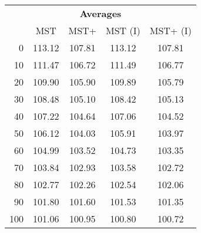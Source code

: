 \begin{tabular}{r|cccc}
      \multicolumn{8}{c}{{\bf Averages }} \\
      & MST & MST+ & MST (I) & MST+ (I) \\ \hline\hline
0
& 113.12
& 107.81
& 113.12
& 107.81
\\
10
& 111.47
& 106.72
& 111.49
& 106.77
\\
20
& 109.90
& 105.90
& 109.89
& 105.79
\\
30
& 108.48
& 105.10
& 108.42
& 105.13
\\
40
& 107.22
& 104.64
& 107.06
& 104.52
\\
50
& 106.12
& 104.03
& 105.91
& 103.97
\\
60
& 104.99
& 103.52
& 104.73
& 103.35
\\
70
& 103.84
& 102.93
& 103.58
& 102.72
\\
80
& 102.77
& 102.26
& 102.54
& 102.06
\\
90
& 101.80
& 101.60
& 101.53
& 101.35
\\
100
& 101.06
& 100.95
& 100.80
& 100.72
\\
\end{tabular}
